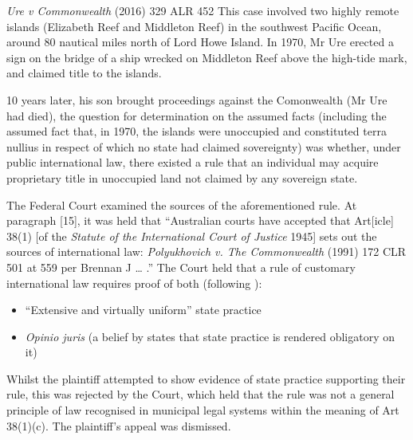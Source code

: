 \begin{casedetails}{\textit{Ure v Commonwealth} (2016) 329 ALR 452}\label{case:Ure v Commonwealth}
    \flushleft
    This case involved two highly remote islands (Elizabeth Reef and Middleton Reef) in the southwest Pacific Ocean, around 80 nautical miles north of Lord Howe Island. In 1970, Mr Ure erected a sign on the bridge of a ship wrecked on Middleton Reef above the high-tide mark, and claimed title to the islands.

    \vspace{\baselineskip}

    10 years later, his son brought proceedings against the Comonwealth (Mr Ure had died), the question for determination on the assumed facts (including the assumed fact that, in 1970, the islands were unoccupied and constituted terra nullius in respect of which no state had claimed sovereignty) was whether, under public international law, there existed a rule that an individual may acquire proprietary title in unoccupied land not claimed by any sovereign state.

    \vspace{\baselineskip}

    The Federal Court examined the sources of the aforementioned rule. At paragraph [15], it was held that ``Australian courts have accepted that Art[icle] 38(1) [of the \textit{Statute of the International Court of Justice} 1945] sets out the sources of international law: \textit{Polyukhovich v. The Commonwealth }(1991) 172 CLR 501 at 559 per Brennan J … .” The Court held that a rule of customary international law requires proof of both (following ):
    \begin{itemize}
        \item ``Extensive and virtually uniform'' state practice
        \item \textit{Opinio juris} (a belief by states that state practice is rendered obligatory on it)
    \end{itemize}

    Whilst the plaintiff attempted to show evidence of state practice supporting their rule, this was rejected by the Court, which held that the rule was not a general principle of law recognised in municipal legal systems within the meaning of Art 38(1)(c). The plaintiff's appeal was dismissed.
\end{casedetails}

